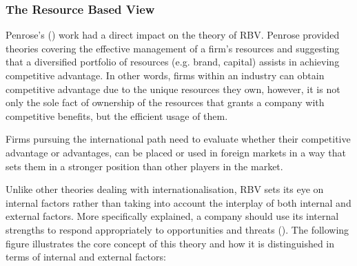 \documentclass[11pt,a4paper]{article}
\begin{document}
{{\subsubsection{The Resource Based View}
\vspace{-1mm}
 \par 
Penrose's (\citeyear{penroseTheoryGrowthFirm2009}) work had a direct impact on the theory of RBV.  Penrose provided theories covering the effective management of a firm's resources and suggesting that a diversified portfolio of resources (e.g. brand, capital) assists in achieving competitive advantage. In other words, firms within an industry can obtain competitive advantage due to the unique resources they own, however, it is not only the sole fact of ownership of the resources that grants a company with competitive benefits, but the efficient usage of them. \par
Firms pursuing the international path need to evaluate whether their competitive advantage or advantages, can be placed or used in foreign markets in a way that sets them in a stronger position than other players in the market. \par
Unlike other theories dealing with internationalisation, RBV sets its eye on internal factors rather than taking into account the interplay of both internal and external factors. More specifically explained, a company should use its internal strengths to respond appropriately to opportunities and threats (\cite{barneyFirmResourcesSustained1991}). The following figure illustrates the core concept of this theory and how it is distinguished in terms of internal and external factors: \\

}}
\end{document}

